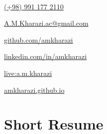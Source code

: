 \documentclass[lighthipster]{simplehipstercv}
\begin{document}
\begin{paracol}{2}
{\bigskip

\vfill

\\[0.5em]
\justifying
\begin{spacing}{1.5}
	
	{\hspace{0.55mm}\large\faMobilePhone}\hspace{2mm}\href{tel:+989911772110}{(+98) 991 177 2110}
	
	{\faEnvelopeO}\hspace{2mm}\href{mailto: a.m.kharazi.ac@gmail.com}{A.M.Kharazi.ac@gmail.com}
	
	{\hspace{0.1mm}\faGithub}\hspace{2mm}\href{https://github.com/amkharazi}{github.com/amkharazi}
	
	{\hspace{0.55mm}\faLinkedin}\hspace{2mm}\href{www.linkedin.com/in/amkharazi}{linkedin.com/in/amkharazi}
	
	{\hspace{0.7mm}\faSkype}\hspace{2mm}\href{live:a.m.kharazi}{live:a.m.kharazi}
	
	{\hspace{0.7mm}\faGlobe}\hspace{2mm}\href{https://amkharazi.github.io/}{amkharazi.github.io}
	
\end{spacing}


\phantom{turn the page}

\phantom{turn the page}
}
\switchcolumn

\small
\section*{Short Resume}

\begin{itemize}
	

\end{itemize}
\end{paracol}
\end{document}
